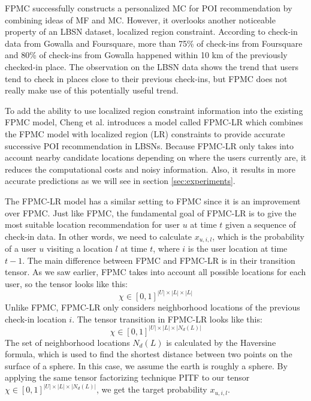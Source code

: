 \documentclass{sig-alternate}
\begin{document}
FPMC successfully constructs a personalized MC for POI recommendation
by combining ideas of MF and MC. However, it overlooks another noticeable property 
of an LBSN dataset, localized region constraint. According to check-in data from 
Gowalla and Foursquare, more than 75\% of check-ins from Foursquare and 80\% of check-ins 
from Gowalla happened within 10 km of the previously checked-in place. The observation on the LBSN data
shows the trend that users tend to check in places close to their previous check-ins, 
but FPMC does not really make use of this potentially useful trend.

To add the ability to use localized region constraint 
information into the existing FPMC model, Cheng et al. \cite{Cheng:2013}
introduces a model called FPMC-LR which combines the FPMC model with localized 
region (LR) constraints to provide accurate successive POI recommendation in LBSNs. 
Because FPMC-LR only takes into account nearby candidate locations depending 
on where the users currently are, it reduces the computational costs and noisy information. 
Also, it results in more accurate predictions as we will see in section \ref{sec:experiments}.

The FPMC-LR model has a similar setting to FPMC since it is an improvement 
over FPMC. Just like FPMC, the fundamental goal of FPMC-LR is to give the most suitable 
location recommendation for user $u$ at time $t$ given a sequence of check-in data. 
In other words, we need to calculate $x_{u,i,l}$, which is the probability of a user $u$ visiting a location $l$ at time $t$,
where $i$ is the user location at time $t-1$.
The main difference between FPMC and FPMC-LR is in their transition tensor. As we saw earlier, FPMC takes into account 
all possible locations for each user, so the tensor looks like this: 
\begin{equation}
	\chi \in [0, 1]^{|U| \times |L| \times |L|}
\label{eq:summation}
\end{equation}
Unlike FPMC, FPMC-LR only considers neighborhood locations of the previous check-in location $i$. 
The tensor transition in FPMC-LR looks like this:
\begin{equation}
	\chi \in [0, 1]^{|U| \times |L| \times |N_d(L)|}
\label{eq:summation}
\end{equation}
The set of neighborhood locations \begin{math}N_d(L)\end{math} is calculated by the Haversine formula, 
which is used to find the shortest distance between two points on the surface of a sphere. 
In this case, we assume the earth is roughly a sphere. By applying the same tensor factorizing technique PITF to 
our tensor $\chi \in [0, 1]^{|U| \times |L| \times |N_d(L)|}$, we get the target probability $x_{u,i,l}$.
\end{document}
